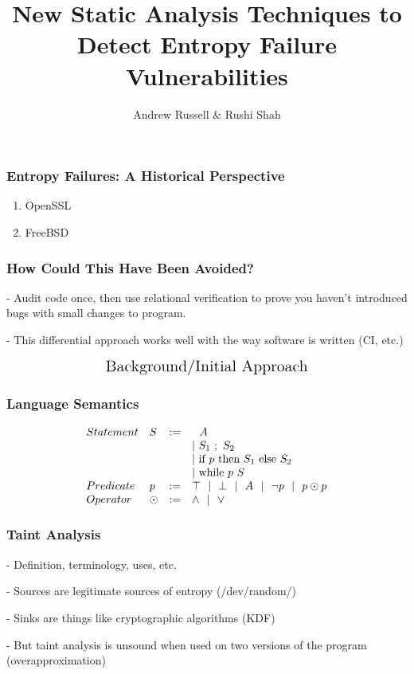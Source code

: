 \documentclass{beamer} %
\title{New Static Analysis Techniques to Detect Entropy Failure Vulnerabilities}
\author{Andrew Russell \& Rushi Shah}
\institute{The University of Texas at Austin}
\theoremstyle{definition} %
\begin{document}
\begin{frame}
\titlepage
\end{frame}

\begin{frame}
\frametitle{Entropy Failures: A Historical Perspective}

	\begin{center}
	\Large{
	\begin{enumerate}
		\item OpenSSL
		\item FreeBSD
	\end{enumerate}
	}
	\end{center}


\end{frame}

\begin{frame}
\frametitle{How Could This Have Been Avoided?}

	- Audit code once, then use relational verification to prove you haven't introduced bugs with small changes to program. 

	- This differential approach works well with the way software is written (CI, etc.)

\end{frame}

\begin{frame}
	\[\text{\Large{Background/Initial Approach}}\]
\end{frame}

\begin{frame}
\frametitle{Language Semantics}

	\[
		\begin{array}{l l c l}
			Statement & S & := & 
				\ \ A \\
				& & & |~ S_1\ ;\ S_2 \\
				& & & |~ \text{if }p\text{ then } S_1 \text{ else } S_2 \\
				& & & |~ \text{while }p\text{ } S \\
			Predicate & p &:=& \top ~~|~~ \bot ~~|~~ A ~~|~~ \lnot p ~~|~~ p \odot p \\
			Operator & \odot &:=& \land ~~|~~ \lor \\
		\end{array}
	\]


\end{frame}

\begin{frame}
\frametitle{Taint Analysis}

	- Definition, terminology, uses, etc.

	- Sources are legitimate sources of entropy (/dev/random/)

	- Sinks are things like cryptographic algorithms (KDF)

	- But taint analysis is unsound when used on two versions of the program (overapproximation)


\end{frame}
\end{document}
